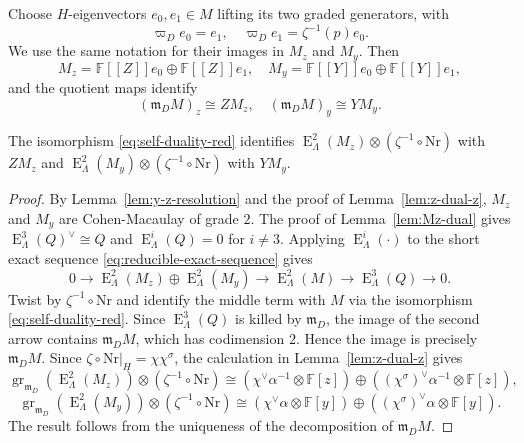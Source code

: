 \documentclass[11pt,a4paper]{article} %
\def\FF{\mathbb{F}}
\def\E{\operatorname{E}}
\def\gr{\operatorname{gr}}
\begin{document}
Choose $H$-eigenvectors $e_0,e_1\in M$ lifting its two graded generators,
with
\[
\varpi_D e_0=e_1,\quad
\varpi_D e_1=\zeta^{-1}(p)e_0.
\]
We use the same notation for their images in $M_z$ and $M_y$. Then
\[
M_z=\FF[[Z]]e_0\oplus\FF[[Z]]e_1,\quad
M_y=\FF[[Y]]e_0\oplus\FF[[Y]]e_1,
\]
and the quotient maps identify
\[
(\mathfrak m_D M)_z\cong ZM_z,\quad
(\mathfrak m_D M)_y\cong YM_y.
\]

\begin{lemma}\label{lem:reducible-dual}
The isomorphism \eqref{eq:self-duality-red} identifies $\E^2_\Lambda(M_z)\otimes(\zeta^{-1}\circ\mathrm{Nr})$ with $ZM_z$ and $\E^2_\Lambda(M_y)\otimes(\zeta^{-1}\circ\mathrm{Nr})$ with $YM_y$.
\end{lemma}

\begin{proof}
By Lemma~\ref{lem:y-z-resolution} and the proof of
Lemma~\ref{lem:z-dual-z}, $M_z$ and $M_y$ are Cohen-Macaulay of grade $2$. The proof of Lemma~\ref{lem:Mz-dual} gives $\E^3_\Lambda(Q)^\vee\cong Q$ and $\E^i_\Lambda(Q)=0$ for $i\ne3$. Applying $\E^i_\Lambda(\cdot)$ to the short exact sequence \eqref{eq:reducible-exact-sequence} gives
\[
0\longrightarrow\E^2_\Lambda(M_z)\oplus\E^2_\Lambda(M_y)
\longrightarrow\E^2_\Lambda(M)
\longrightarrow\E^3_\Lambda(Q)\longrightarrow0.
\]
Twist by $\zeta^{-1}\circ\mathrm{Nr}$ and identify the middle term with $M$ via the isomorphism \eqref{eq:self-duality-red}. Since $\E^3_\Lambda(Q)$ is killed by $\mathfrak m_D$, the image of the second arrow contains $\mathfrak m_D M$, which has codimension $2$. Hence the image is precisely $\mathfrak m_D M$. Since $\zeta\circ\mathrm{Nr}|_H=\chi\chi^\sigma$, the calculation
in Lemma~\ref{lem:z-dual-z} gives
\[
\gr_{\mathfrak m_D}
\left(\E^2_\Lambda(M_z)\right)\otimes(\zeta^{-1}\circ\mathrm{Nr})\cong(\chi^\vee\alpha^{-1}\otimes\FF[z])
\oplus\left((\chi^\sigma)^\vee\alpha^{-1}\otimes\FF[z]\right),
\]
\[
\gr_{\mathfrak m_D}
\left(\E^2_\Lambda(M_y)\right)\otimes(\zeta^{-1}\circ\mathrm{Nr})\cong(\chi^\vee\alpha\otimes\FF[y])
\oplus\left((\chi^\sigma)^\vee\alpha\otimes\FF[y]\right).
\]
The result follows from the uniqueness of the decomposition of $\mathfrak m_D M$.
\end{proof}
\end{document}
